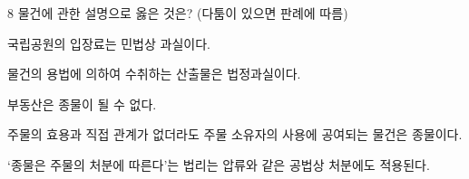 \begin{question}{8}
물건에 관한 설명으로 옳은 것은? (다툼이 있으면 판례에 따름)
\begin{choices}
  \item 국립공원의 입장료는 민법상 과실이다.
  \item 물건의 용법에 의하여 수취하는 산출물은 법정과실이다.
  \item 부동산은 종물이 될 수 없다.
  \item 주물의 효용과 직접 관계가 없더라도 주물 소유자의 사용에 공여되는 물건은 종물이다.
  \item ‘종물은 주물의 처분에 따른다’는 법리는 압류와 같은 공법상 처분에도 적용된다.
\end{choices}
\end{question}
